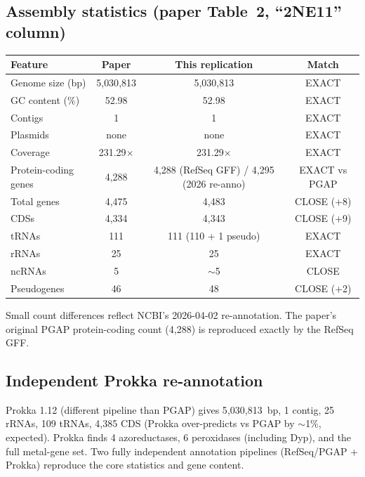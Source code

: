\documentclass[11pt]{article}
\begin{document}
\subsection{Assembly statistics (paper Table~2, ``2NE11'' column)}
\begin{tabular}{lccc}
\toprule
Feature & Paper & This replication & Match \\
\midrule
Genome size (bp) & 5{,}030{,}813 & 5{,}030{,}813 & EXACT \\
GC content (\%) & 52.98 & 52.98 & EXACT \\
Contigs & 1 & 1 & EXACT \\
Plasmids & none & none & EXACT \\
Coverage & 231.29$\times$ & 231.29$\times$ & EXACT \\
Protein-coding genes & 4{,}288 & 4{,}288 (RefSeq GFF) / 4{,}295 (2026 re-anno) & EXACT vs PGAP \\
Total genes & 4{,}475 & 4{,}483 & CLOSE (+8) \\
CDSs & 4{,}334 & 4{,}343 & CLOSE (+9) \\
tRNAs & 111 & 111 (110 + 1 pseudo) & EXACT \\
rRNAs & 25 & 25 & EXACT \\
ncRNAs & 5 & $\sim$5 & CLOSE \\
Pseudogenes & 46 & 48 & CLOSE (+2) \\
\bottomrule
\end{tabular}

Small count differences reflect NCBI's 2026-04-02 re-annotation. The paper's
original PGAP protein-coding count (4{,}288) is reproduced exactly by the
RefSeq GFF.

\subsection{Independent Prokka re-annotation}
Prokka 1.12 (different pipeline than PGAP) gives 5{,}030{,}813~bp, 1 contig,
25 rRNAs, 109 tRNAs, 4{,}385 CDS (Prokka over-predicts vs PGAP by $\sim$1\%,
expected). Prokka finds 4 azoreductases, 6 peroxidases (including Dyp), and
the full metal-gene set. Two fully independent annotation pipelines
(RefSeq/PGAP + Prokka) reproduce the core statistics and gene content.
\end{document}
